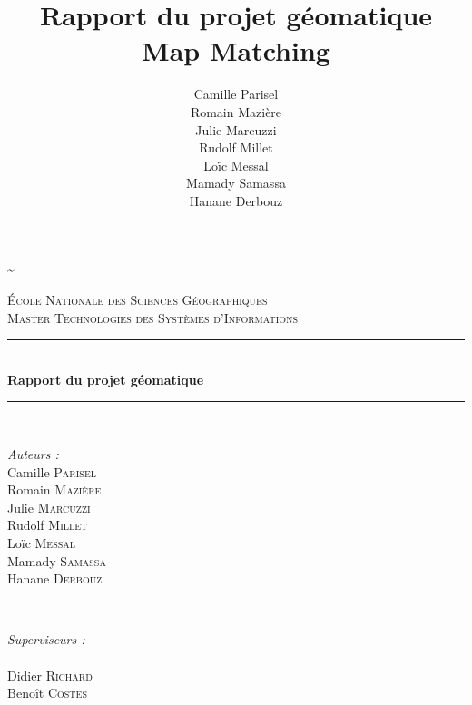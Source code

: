 \documentclass[10pt,a4paper]{report} %
\title{Rapport du projet géomatique \\ Map Matching}
\author{Camille Parisel \\ Romain Mazière \\ Julie Marcuzzi \\ Rudolf Millet \\ Loïc Messal \\ Mamady Samassa \\ Hanane Derbouz}
\begin{document}
\begin{titlepage}

\~ 
\newline
\\[2cm]
\newcommand{\HRule}{\rule{\linewidth}{0.5mm}} %

\center %


\textsc{\LARGE \'Ecole Nationale des Sciences Géographiques}\\[0.5cm] %
\textsc{\Large Master Technologies des Systèmes d'Informations}\\[0.5cm] %

\HRule \\[0.4cm]
{ \huge \bfseries Rapport du projet géomatique}\\[0.4cm] %
\HRule \\[1.5cm]
\vfill

\begin{minipage}[t]{0.4\textwidth}
\begin{flushleft} \large
\emph{Auteurs : } \newline \\
Camille \textsc{Parisel} \\ 
Romain \textsc{Mazière} \\ 
Julie \textsc{Marcuzzi} \\ 
Rudolf \textsc{Millet} \\ 
Loïc \textsc{Messal} \\ 
Mamady \textsc{Samassa} \\ 
Hanane \textsc{Derbouz}

\end{flushleft}
\end{minipage}
~
\begin{minipage}[t]{0.4\textwidth}
\begin{flushright} \large
\emph{Superviseurs : \\ \ \\ } 
Didier \textsc{Richard} \\
Benoît \textsc{Costes} \\
\end{flushright}
\end{minipage}\\[1cm]


\end{titlepage}
\end{document}
